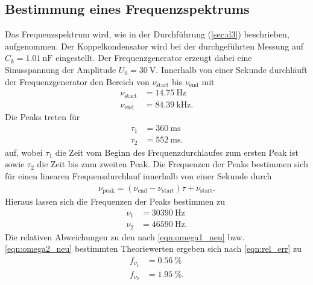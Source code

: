 \subsection{Bestimmung eines Frequenzspektrums}
Das Frequenzspektrum wird, wie in der Durchführung (\ref{sec:d3}) beschrieben, aufgenommen.
Der Koppelkondensator wird bei der durchgeführten Messung auf $C_k = \SI{1.01}{\nano\farad}$ eingestellt.
Der Frequenzgenerator erzeugt dabei eine Sinusspannung der Amplitude $U_0 = \SI{30}{\volt}$.
Innerhalb von einer Sekunde durchläuft der Frequenzgenerator den Bereich von $\nu_{\text{start}}$ bis $\nu_{\text{end}}$ mit
\begin{align*}
  \nu_{\text{start}} &= \SI{14.75}{\hertz} \\
  \nu_{\text{end}} &= \SI{84.39}{\kilo\hertz}.
\end{align*}
Die Peaks treten für
\begin{align*}
  \tau_1 &= \SI{360}{\milli\second} \\
  \tau_2 &= \SI{552}{\milli\second}.
\end{align*}
auf, wobei $\tau_1$ die Zeit vom Beginn des Frequenzdurchlaufes zum ersten Peak ist sowie $\tau_2$ die Zeit bis zum zweiten Peak.
Die Frequenzen der Peaks bestimmen sich für einen linearen Frequenzdurchlauf innerhalb von einer Sekunde durch
\begin{align}
  \nu_{\text{peak}} = (\nu_{\text{end}} - \nu_{\text{start}}) \tau + \nu_{\text{start}}.
\end{align}
Hieraus lassen sich die Frequenzen der Peaks bestimmen zu
\begin{align*}
  \nu_1 &= \SI{30390}{\hertz} \\
  \nu_2 &= \SI{46590}{\hertz}.
\end{align*}
Die relativen Abweichungen zu den nach \ref{eqn:omega1_neu} bzw. \ref{eqn:omega2_neu} bestimmten Theoriewerten ergeben sich nach \eqref{eqn:rel_err} zu
\begin{align*}
  f_{\nu_1} &= \SI{0.56}{\percent} \\
  f_{\nu_2} &= \SI{1.95}{\percent}.
\end{align*}
%
%
%
%
